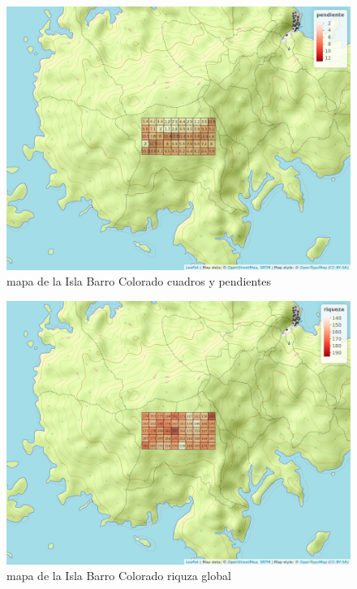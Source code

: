 \documentclass[11pt,]{article}
\begin{document}
\begin{figure}
\centering
\includegraphics[width=1.00000\textwidth]{mapa_cuadros_pendiente.png}
\caption{mapa de la Isla Barro Colorado cuadros y pendientes
\label{fig:bci_map}}
\end{figure}

\begin{figure}
\centering
\includegraphics[width=1.00000\textwidth]{mapa_cuadros_riq_global.png}
\caption{mapa de la Isla Barro Colorado riquza global
\label{fig:bci_map}}
\end{figure}
\end{document}
